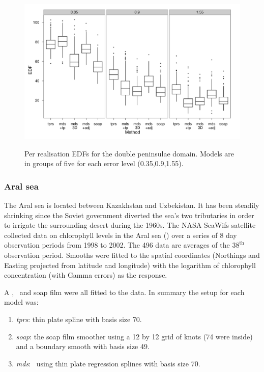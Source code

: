 \begin{figure}
\centering
\includegraphics[width=\textwidth]{mds/figs/big-mds-wt2-boxplot-edf.pdf} \\
\caption{Per realisation EDFs for the double peninsulae domain. Models are in groups of five for each error level (0.35,0.9,1.55).}
\label{big-wt2-edfs}
\end{figure}



\subsubsection{Aral sea}
\label{aral-sec}

The Aral sea is located between Kazakhstan and Uzbekistan. It has been steadily shrinking since the Soviet government diverted the sea's two tributaries in order to irrigate the surrounding desert during the 1960s. The NASA SeaWifs satellite collected data on chlorophyll levels in the Aral sea (\cite{soap}) over a series of 8 day observation periods from 1998 to 2002. The 496 data are averages of the $38^\text{th}$ observation period. Smooths were fitted to the spatial coordinates (Northings and Easting projected from latitude and longitude) with the logarithm of chlorophyll concentration (with Gamma errors) as the response.

A \tprs, \mdsap\ and soap film were all fitted to the data. In summary the setup for each model was:

\begin{enumerate}
\item \emph{tprs}: thin plate spline with basis size 70.
\item \emph{soap}: the soap film smoother using a 12 by 12 grid of knots (74 were inside) and a boundary smooth with basis size 49.
\item \emph{mds}: \mdsap\ using thin plate regression splines with basis size 70.
\end{enumerate}

